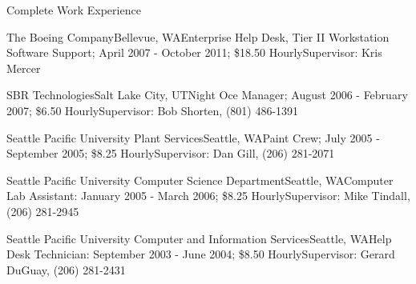 \documentclass[11pt,oneside]{article}
\begin{document}
\heading

\begin{ressection}{Complete Work Experience}

    \begin{expsubsec}{The Boeing Company}{Bellevue, WA}{Enterprise Help Desk, Tier II Workstation Software Support; April 2007 - October 2011; \$18.50 Hourly}{Supervisor: Kris Mercer}
    \end{expsubsec}

    \begin{expsubsec}{SBR Technologies}{Salt Lake City, UT}{Night Oce Manager; August 2006 - February 2007; \$6.50 Hourly}{Supervisor: Bob Shorten, (801) 486-1391}
    \end{expsubsec}

    \begin{expsubsec}{Seattle Pacific University Plant Services}{Seattle, WA}{Paint Crew; July 2005 - September 2005; \$8.25 Hourly}{Supervisor: Dan Gill, (206) 281-2071}
    \end{expsubsec}

    \begin{expsubsec}{Seattle Pacific University Computer Science Department}{Seattle, WA}{Computer Lab Assistant: January 2005 - March 2006; \$8.25 Hourly}{Supervisor: Mike Tindall, (206) 281-2945}
    \end{expsubsec}

    \begin{expsubsec}{Seattle Pacific University Computer and Information Services}{Seattle, WA}{Help Desk Technician: September 2003 - June 2004; \$8.50 Hourly}{Supervisor: Gerard DuGuay, (206) 281-2431}
    \end{expsubsec}


\end{ressection}
\end{document}
